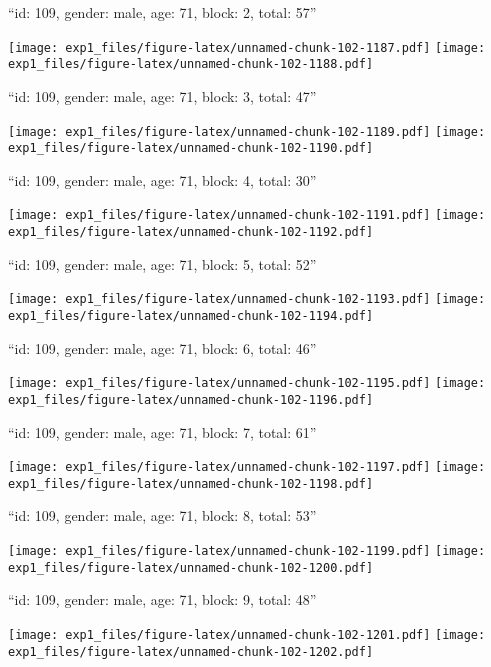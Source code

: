\documentclass[11pt,,]{article}
\begin{document}
\newpage
[1] 

``id: 109, gender: male, age: 71, block: 2, total: 57''

\texttt{[image: exp1\_files/figure-latex/unnamed-chunk-102-1187.pdf]}
\texttt{[image: exp1\_files/figure-latex/unnamed-chunk-102-1188.pdf]}

\newpage
[1] 

``id: 109, gender: male, age: 71, block: 3, total: 47''

\texttt{[image: exp1\_files/figure-latex/unnamed-chunk-102-1189.pdf]}
\texttt{[image: exp1\_files/figure-latex/unnamed-chunk-102-1190.pdf]}

\newpage
[1] 

``id: 109, gender: male, age: 71, block: 4, total: 30''

\texttt{[image: exp1\_files/figure-latex/unnamed-chunk-102-1191.pdf]}
\texttt{[image: exp1\_files/figure-latex/unnamed-chunk-102-1192.pdf]}

\newpage
[1] 

``id: 109, gender: male, age: 71, block: 5, total: 52''

\texttt{[image: exp1\_files/figure-latex/unnamed-chunk-102-1193.pdf]}
\texttt{[image: exp1\_files/figure-latex/unnamed-chunk-102-1194.pdf]}

\newpage
[1] 

``id: 109, gender: male, age: 71, block: 6, total: 46''

\texttt{[image: exp1\_files/figure-latex/unnamed-chunk-102-1195.pdf]}
\texttt{[image: exp1\_files/figure-latex/unnamed-chunk-102-1196.pdf]}

\newpage
[1] 

``id: 109, gender: male, age: 71, block: 7, total: 61''

\texttt{[image: exp1\_files/figure-latex/unnamed-chunk-102-1197.pdf]}
\texttt{[image: exp1\_files/figure-latex/unnamed-chunk-102-1198.pdf]}

\newpage
[1] 

``id: 109, gender: male, age: 71, block: 8, total: 53''

\texttt{[image: exp1\_files/figure-latex/unnamed-chunk-102-1199.pdf]}
\texttt{[image: exp1\_files/figure-latex/unnamed-chunk-102-1200.pdf]}

\newpage
[1] 

``id: 109, gender: male, age: 71, block: 9, total: 48''

\texttt{[image: exp1\_files/figure-latex/unnamed-chunk-102-1201.pdf]}
\texttt{[image: exp1\_files/figure-latex/unnamed-chunk-102-1202.pdf]}
\end{document}
